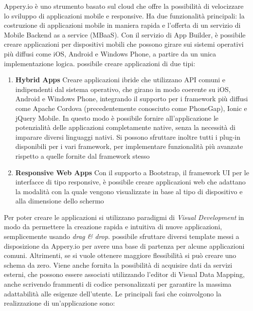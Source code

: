 Appery.io è uno strumento basato sul cloud che offre la possibilità di velocizzare lo sviluppo di applicazioni mobile e responsive. Ha due funzionalità principali: la costruzione di applicazioni mobile in maniera rapida e l'offerta di un servizio di Mobile Backend as a service (MBaaS).
Con il servizio di App Builder, è possibile creare applicazioni per dispositivi mobili che possono girare sui sistemi operativi più diffusi come iOS, Android e Windows Phone, a partire da un unica implementazione logica.
\upe possibile creare applicazioni di due tipi: 
\begin{enumerate}
	\item \textbf{Hybrid Apps} Creare applicazioni ibride che utilizzano API comuni e indipendenti dal sistema operativo, che girano in modo coerente su iOS, Android e Windows Phone, integrando il supporto per i framework più diffusi come Apache Cordova (precedentemente conosciuto come PhoneGap), Ionic e jQuery Mobile. In questo modo è possibile fornire all'applicazione le potenzialità delle applicazioni completamente native, senza la necessità di imparare diversi linguaggi nativi. Si possono sfruttare inoltre tutti i plug-in disponibili per i vari framework, per implementare funzionalità più avanzate rispetto a quelle fornite dal framework stesso
	\item \textbf{Responsive Web Apps}
	Con il supporto a Bootstrap, il framework UI per le interfacce di tipo responsive, è possibile creare applicazioni web che adattano la modalità con la quale vengono visualizzate in base al tipo di dispositivo e alla dimensione dello schermo
\end{enumerate}

Per poter creare le applicazioni si utilizzano paradigmi di \emph{Visual Development} in modo da permettere la creazione rapida e intuitiva di nuove applicazioni, semplicemente usando \emph{drag \& drop}. \upe possibile sfruttare diversi template messi a disposizione da Appery.io per avere una base di partenza per alcune applicazioni comuni. Altrimenti, se si vuole ottenere maggiore flessibilità si può creare uno schema da zero. Viene anche fornita la possibilità di acquisire dati da servizi esterni, che possono essere associati utilizzando l'editor di Visual Data Mapping, anche scrivendo frammenti di codice personalizzati per garantire la massima adattabilità alle esigenze dell'utente. Le principali fasi che coinvolgono la realizzazione di un'applicazione sono:

